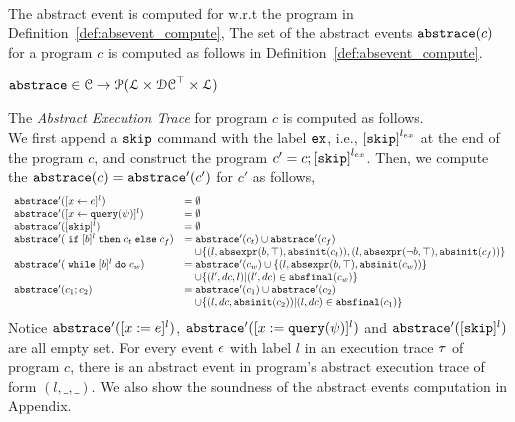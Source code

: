 \\
The abstract event is computed for w.r.t the program in Definition~\ref{def:absevent_compute}, 
The set of the abstract events $\mathtt{abs}{\mathtt{trace}}(c)$ for a program $c$
is computed as follows in Definition~\ref{def:absevent_compute}.
 \begin{defn}
 \label{def:absevent_compute}
  $\mathtt{abs}{\mathtt{trace}} \in \mathcal{C} \to \mathcal{P}( \mathcal{L} \times \mathcal{DC}^{\top} \times \mathcal{L} )$
  \end{defn}
 The \emph{Abstract Execution Trace} for program $c$ is computed as follows.
 \\
 We first append a $\mathtt{skip}$ command with 
the label $\mathtt{ex}$, i.e., $\clabel{\eskip}^{l_{ex}}$ at the end of the program $c$, and construct 
the program $c' = c;\clabel{\eskip}^{l_{ex}}$.
Then, we compute the $\mathtt{abs}{\mathtt{trace}}(c) = \mathtt{abs}{\mathtt{trace}}'(c')$ for $c'$ as follows,
 {\footnotesize
 \[
   \begin{array}{ll}
      \absflow'(\clabel{\assign{x}{\expr}}{}^l)  & = \emptyset  \\
      \absflow'(\clabel{\assign{x}{\query(\qexpr)}}{}^l)  & = \emptyset  \\
      \absflow'([\eskip]^{l})  & = \emptyset \\
      \absflow'(\eif [b]^l \ethen c_t \eelse c_f)  & =  \absflow'(c_t) \cup \absflow'(c_f)
        \\ & \quad 
        \cup \{(l, \absexpr(\bexpr, \top),  \absinit(c_t) ) ,  (l, \absexpr(\neg\bexpr, \top), \absinit(c_f)) \} \\
       \absflow'(\ewhile [b]^l \edo c_w)  & =  \absflow'(c_w) \cup \{(l, \absexpr(\bexpr, \top), \absinit(c_w)) \} 
       \\ & \quad 
       \cup \{(l', dc, l)| (l', dc) \in \absfinal(c_w) \} \\
       \absflow'(c_1 ; c_2)  & = \absflow'(c_1) \cup  \absflow'(c_2) 
       \\ & \quad 
       \cup \{ (l, dc, \absinit(c_2)) | (l, dc) \in \absfinal(c_1) \} \\
   \end{array}
   \]
   }
   Notice $\mathtt{abs}{\mathtt{trace}}'([x := e]^{l})$, $\mathtt{abs}{\mathtt{trace}}'([x := {\tt query}(\psi)]^{l})$ and $\mathtt{abs}{\mathtt{trace}}'([\mathtt{skip}]^{l})$ are all empty set. 
   For every event $\mathtt{\epsilon}$ with label $l$ in an execution trace $\mathtt{\tau}$ of program $c$, 
   there is an abstract event in program's abstract execution trace of form $(l, \_, \_)$.  
   We also show the soundness of the abstract events computation in Appendix.

